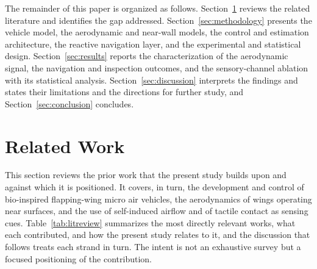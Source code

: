 \documentclass[final,5p,times]{elsarticle}
\begin{document}
The remainder of this paper is organized as follows. Section~\ref{sec:relatedwork} reviews the related literature and identifies the gap addressed. Section~\ref{sec:methodology} presents the vehicle model, the aerodynamic and near-wall models, the control and estimation architecture, the reactive navigation layer, and the experimental and statistical design. Section~\ref{sec:results} reports the characterization of the aerodynamic signal, the navigation and inspection outcomes, and the sensory-channel ablation with its statistical analysis. Section~\ref{sec:discussion} interprets the findings and states their limitations and the directions for further study, and Section~\ref{sec:conclusion} concludes.

\section{Related Work}
\label{sec:relatedwork}

This section reviews the prior work that the present study builds upon and against which it is positioned. It covers, in turn, the development and control of bio-inspired flapping-wing micro air vehicles, the aerodynamics of wings operating near surfaces, and the use of self-induced airflow and of tactile contact as sensing cues. Table~\ref{tab:litreview} summarizes the most directly relevant works, what each contributed, and how the present study relates to it, and the discussion that follows treats each strand in turn. The intent is not an exhaustive survey but a focused positioning of the contribution.
\end{document}
